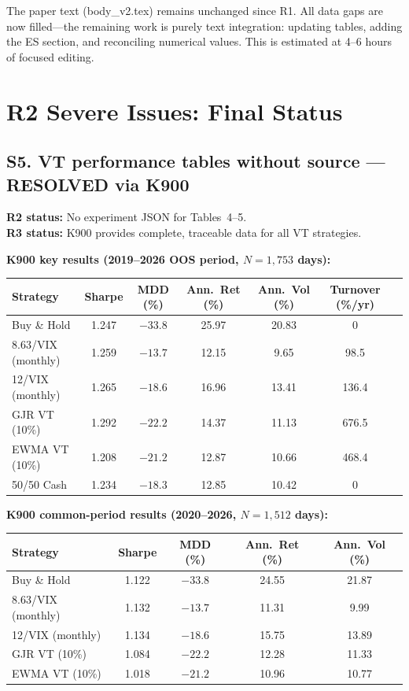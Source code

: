 \documentclass[12pt,a4paper]{article}
\begin{document}
The paper text (body\_v2.tex) remains unchanged since R1. All data gaps are now filled---the remaining work is purely text integration: updating tables, adding the ES section, and reconciling numerical values. This is estimated at 4--6 hours of focused editing.


\section*{R2 Severe Issues: Final Status}

\subsection*{\textcolor{okgreen}{S5. VT performance tables without source --- RESOLVED via K900}}

\textbf{R2 status:} No experiment JSON for Tables~4--5.\\
\textbf{R3 status:} \textcolor{okgreen}{K900 provides complete, traceable data for all VT strategies.}

\medskip
\noindent\textbf{K900 key results (2019--2026 OOS period, $N = 1{,}753$ days):}

\begin{center}
\small
\begin{tabular}{lcccccc}
\toprule
Strategy & Sharpe & MDD (\%) & Ann.\ Ret (\%) & Ann.\ Vol (\%) & Turnover (\%/yr) \\
\midrule
Buy \& Hold & 1.247 & $-33.8$ & 25.97 & 20.83 & 0 \\
8.63/VIX (monthly) & 1.259 & $-13.7$ & 12.15 & 9.65 & 98.5 \\
12/VIX (monthly) & 1.265 & $-18.6$ & 16.96 & 13.41 & 136.4 \\
GJR VT (10\%) & 1.292 & $-22.2$ & 14.37 & 11.13 & 676.5 \\
EWMA VT (10\%) & 1.208 & $-21.2$ & 12.87 & 10.66 & 468.4 \\
50/50 Cash & 1.234 & $-18.3$ & 12.85 & 10.42 & 0 \\
\bottomrule
\end{tabular}
\end{center}

\noindent\textbf{K900 common-period results (2020--2026, $N = 1{,}512$ days):}

\begin{center}
\small
\begin{tabular}{lcccc}
\toprule
Strategy & Sharpe & MDD (\%) & Ann.\ Ret (\%) & Ann.\ Vol (\%) \\
\midrule
Buy \& Hold & 1.122 & $-33.8$ & 24.55 & 21.87 \\
8.63/VIX (monthly) & 1.132 & $-13.7$ & 11.31 & 9.99 \\
12/VIX (monthly) & 1.134 & $-18.6$ & 15.75 & 13.89 \\
GJR VT (10\%) & 1.084 & $-22.2$ & 12.28 & 11.33 \\
EWMA VT (10\%) & 1.018 & $-21.2$ & 10.96 & 10.77 \\
\bottomrule
\end{tabular}
\end{center}
\end{document}
